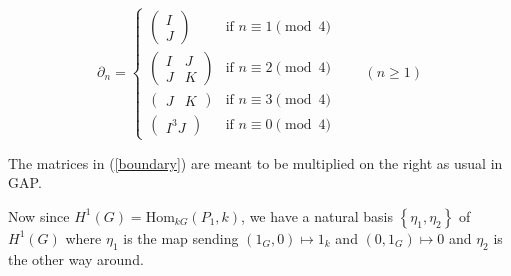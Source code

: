\documentclass[12pt]{article}
\begin{document}
\begin{equation}\label{boundary}
\partial_n=\begin{cases}
\begin{pmatrix}I\\J\end{pmatrix}&\text{if }n\equiv 1\pmod{4}\\
\begin{pmatrix}I&J\\J&K\end{pmatrix}&\text{if }n\equiv 2\pmod{4}\\
\begin{pmatrix}J&K\end{pmatrix}&\text{if }n\equiv 3\pmod{4}\\
\begin{pmatrix}I^3J\end{pmatrix}&\text{if }n\equiv 0\pmod{4}
\end{cases}\qquad\left(n\ge 1\right)
\end{equation}

The matrices in (\ref{boundary}) are meant to be multiplied on the right
as usual in \textsf{GAP}.

Now since $H^1\left(G\right)=\mathrm{Hom}_{kG}\left(P_1,k\right)$,
we have a natural basis 
$\left\{\eta_1,\eta_2\right\}$ of $H^1\left(G\right)$
where $\eta_1$ is the map sending $\left(1_G,0\right)\mapsto 1_k$
and $\left(0,1_G\right)\mapsto 0$ and $\eta_2$ is the other way
around. 
\end{document}

